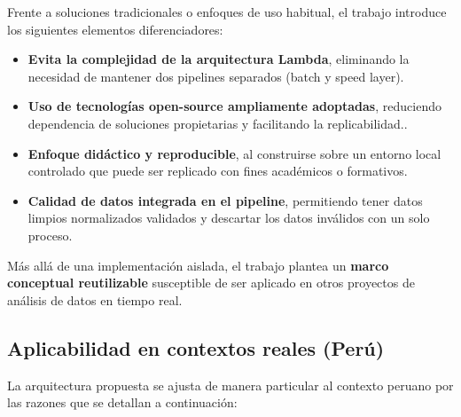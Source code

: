 \documentclass[12pt,a4paper]{article}
\providecommand{\tightlist}{%
  \setlength{\itemsep}{0pt}\setlength{\parskip}{0pt}}
\begin{document}
Frente a soluciones tradicionales o enfoques de uso habitual, el trabajo introduce los siguientes elementos diferenciadores:

\begin{itemize}
    \tightlist
    \item
          \textbf{Evita la complejidad de la arquitectura Lambda}, eliminando la necesidad de mantener dos pipelines separados (batch y speed layer).
    \item
          \textbf{Uso de tecnologías open-source ampliamente adoptadas}, reduciendo dependencia de soluciones propietarias y facilitando la replicabilidad..
    \item
          \textbf{Enfoque didáctico y reproducible}, al construirse sobre un entorno local controlado que puede ser replicado con fines académicos o formativos.
    \item
          \textbf{Calidad de datos integrada en el pipeline}, permitiendo tener datos limpios normalizados validados y descartar los datos inválidos con un solo proceso.
\end{itemize}

Más allá de una implementación aislada, el trabajo plantea un \textbf{marco conceptual reutilizable} susceptible de ser aplicado en otros proyectos de análisis de datos en tiempo real.

\subsection{Aplicabilidad en contextos reales (Perú)}\label{aplicabilidad-en-contextos-reales-peruxfa}

La arquitectura propuesta se ajusta de manera particular al contexto peruano por las razones que se detallan a continuación:
\end{document}
